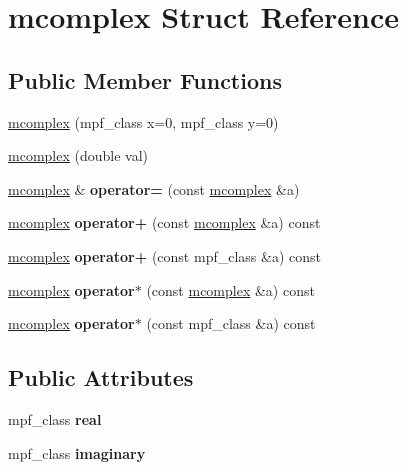 \hypertarget{structmcomplex}{}\section{mcomplex Struct Reference}
\label{structmcomplex}
\subsection*{Public Member Functions}
\begin{DoxyCompactItemize}
\item 
\hyperlink{structmcomplex_aba1371bb1d9736b07e8b7e06dd2b658b}{mcomplex} (mpf\+\_\+class x=0, mpf\+\_\+class y=0)
\item 
\hyperlink{structmcomplex_adb504792d5a48b45b9767b7abea5c890}{mcomplex} (double val)
\item 
\hyperlink{structmcomplex}{mcomplex} \& {\bfseries operator=} (const \hyperlink{structmcomplex}{mcomplex} \&a)\hypertarget{structmcomplex_a723f4315ac0f591a340b2b4fce14cfca}{}\label{structmcomplex_a723f4315ac0f591a340b2b4fce14cfca}

\item 
\hyperlink{structmcomplex}{mcomplex} {\bfseries operator+} (const \hyperlink{structmcomplex}{mcomplex} \&a) const \hypertarget{structmcomplex_a898ebc37a7589c62ea3f575e9310e245}{}\label{structmcomplex_a898ebc37a7589c62ea3f575e9310e245}

\item 
\hyperlink{structmcomplex}{mcomplex} {\bfseries operator+} (const mpf\+\_\+class \&a) const \hypertarget{structmcomplex_a819cf590a4d69415fbc2e9765a6e9fbb}{}\label{structmcomplex_a819cf590a4d69415fbc2e9765a6e9fbb}

\item 
\hyperlink{structmcomplex}{mcomplex} {\bfseries operator$\ast$} (const \hyperlink{structmcomplex}{mcomplex} \&a) const \hypertarget{structmcomplex_a62586df94a57813bc5af24246b1d3bc0}{}\label{structmcomplex_a62586df94a57813bc5af24246b1d3bc0}

\item 
\hyperlink{structmcomplex}{mcomplex} {\bfseries operator$\ast$} (const mpf\+\_\+class \&a) const \hypertarget{structmcomplex_a2a20aac66a9abf200378c883906dfffd}{}\label{structmcomplex_a2a20aac66a9abf200378c883906dfffd}

\end{DoxyCompactItemize}
\subsection*{Public Attributes}
\begin{DoxyCompactItemize}
\item 
mpf\+\_\+class {\bfseries real}\hypertarget{structmcomplex_ad49612ba45673f6619c5e90394a8879f}{}\label{structmcomplex_ad49612ba45673f6619c5e90394a8879f}

\item 
mpf\+\_\+class {\bfseries imaginary}\hypertarget{structmcomplex_a15a0dd84829a31d608893ad4c28ad734}{}\label{structmcomplex_a15a0dd84829a31d608893ad4c28ad734}

\end{DoxyCompactItemize}


